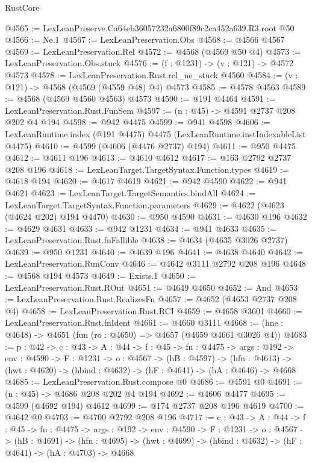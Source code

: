 \begin{lexlean}{RustCore}
\begin{coremodule}
@4565 := LexLeanPreserve.Ca64eb36057232a6800f89c2ca452a639.R3.root @50
@4566 := Ne.{1}
@4567 := LexLeanPreservation.Obs
@4568 := @4566 @4567
@4569 := LexLeanPreservation.Rel
@4572 := @4568 (@4569 @50 @4)
@4573 := LexLeanPreservation.Obs.stuck
@4576 := (f : @1231) -> (v : @121) -> @4572 @4573
@4578 := LexLeanPreservation.Rust.rel_ne_stuck @4560
@4584 := (v : @121) -> @4568 (@4569 (@4559 @48) @4) @4573
@4585 := @4578 @4563
@4589 := @4568 (@4569 @4560 @4563) @4573
@4590 := @191 @4464
@4591 := LexLeanPreservation.Rust.FunSem
@4597 := (n : @45) -> @4591 @2737 @208 @202 @4 @194
@4598 := @942 @4475
@4599 := @941 @4598
@4606 := LexLeanRuntime.index (@191 @4475) @4475 (LexLeanRuntime.instIndexableList @4475)
@4610 := @4599 (@4606 (@4476 @2737) @194)
@4611 := @950 @4475
@4612 := @4611 @196
@4613 := @4610 @4612
@4617 := @163 @2792 @2737 @208 @196
@4618 := LexLeanTarget.TargetSyntax.Function.types
@4619 := @4618 @194
@4620 := @4617 @4619
@4621 := @942 @4590
@4622 := @941 @4621
@4623 := LexLeanTarget.TargetSemantics.bindAll
@4624 := LexLeanTarget.TargetSyntax.Function.parameters
@4629 := @4622 (@4623 (@4624 @202) @194 @4470)
@4630 := @950 @4590
@4631 := @4630 @196
@4632 := @4629 @4631
@4633 := @942 @1231
@4634 := @941 @4633
@4635 := LexLeanPreservation.Rust.fnFallible
@4638 := @4634 (@4635 @3026 @2737)
@4639 := @950 @1231
@4640 := @4639 @196
@4641 := @4638 @4640
@4642 := LexLeanPreservation.RunConv
@4646 := @4642 @3111 @2792 @208 @196
@4648 := @4568 @194 @4573
@4649 := Exists.{1}
@4650 := LexLeanPreservation.Rust.ROut
@4651 := @4649 @4650
@4652 := And
@4653 := LexLeanPreservation.Rust.RealizesFn
@4657 := @4652 (@4653 @2737 @208 @4)
@4658 := LexLeanPreservation.Rust.RCI
@4659 := @4658 @3601
@4660 := LexLeanPreservation.Rust.fnIdent
@4661 := @4660 @3111
@4668 := (hne : @4648) -> @4651 (fun (ro : @4650) => @4657 (@4659 @4661 @3026 @4))
@4683 := {p : @42} ->
  {c : @43} ->
  {A : @44} ->
  {f : @45} ->
  {fn : @4475} ->
  {args : @192} ->
  {env : @4590} ->
  {F : @1231} ->
  {o : @4567} ->
  (hB : @4597) ->
  (hfn : @4613) -> (hwt : @4620) -> (hbind : @4632) -> (hF : @4641) -> (hA : @4646) -> @4668
@4685 := LexLeanPreservation.Rust.compose @0
@4686 := @4591 @0
@4691 := (n : @45) -> @4686 @208 @202 @4 @194
@4692 := @4606 @4477
@4695 := @4599 (@4692 @194) @4612
@4699 := @174 @2737 @208 @196 @4619
@4700 := @4642 @0
@4703 := @4700 @2792 @208 @196
@4717 := {c : @43} ->
  {A : @44} ->
  {f : @45} ->
  {fn : @4475} ->
  {args : @192} ->
  {env : @4590} ->
  {F : @1231} ->
  {o : @4567} ->
  (hB : @4691) ->
  (hfn : @4695) -> (hwt : @4699) -> (hbind : @4632) -> (hF : @4641) -> (hA : @4703) -> @4668

\end{coremodule}
\end{lexlean}
